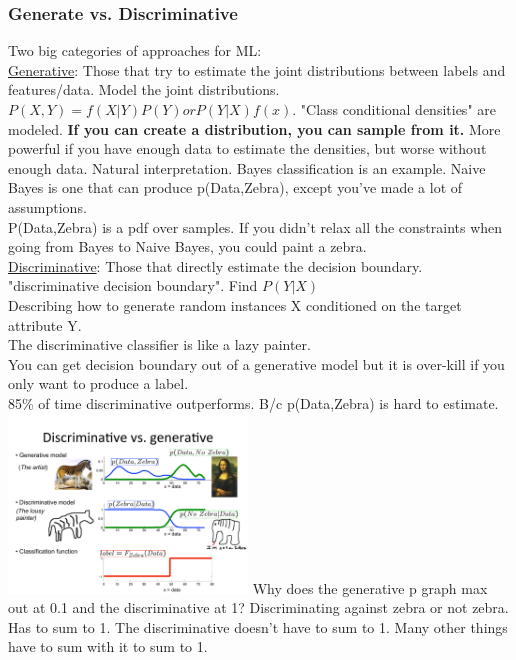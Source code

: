 \subsubsection{Generate vs. Discriminative}
Two big categories of approaches for ML: \hfill \\
\underline{Generative}:
		Those that try to estimate the joint distributions between labels and features/data. 
		Model the joint distributions. $P(X,Y) = f(X|Y) P(Y) or P(Y|X)f(x)$.  
		"Class conditional densities" are modeled.  %
		\textbf{If you can create a distribution, you can sample from it.}  %
		More powerful if you have enough data to estimate the densities, but worse without enough data.
		Natural interpretation.  
		Bayes classification is an example.    
		Naive Bayes is one that can produce p(Data,Zebra), except you've made a lot of assumptions.   \hfill \\  %
		P(Data,Zebra) is a pdf over samples. 
		If you didn't relax all the constraints when going from Bayes to Naive Bayes, you could paint a zebra. 
 \hfill \\
\underline{Discriminative}:
		Those that directly estimate the decision boundary.  "discriminative decision boundary".  Find $P(Y|X)$ \hfill \\
		Describing how to generate random instances X conditioned on the target attribute Y.  \hfill \\
		 The discriminative classifier is like a lazy painter.  \hfill \\  %
		 You can get decision boundary out of a generative model but it is over-kill if you only want to produce a label.  \hfill \\  %
		 85\% of time discriminative outperforms.  B/c p(Data,Zebra) is hard to estimate.  \hfill \\  %
		 
\includegraphics[width=2.5in]{figures/zebra_painting.pdf}
Why does the generative p graph max out at 0.1 and the discriminative at 1?   
    Discriminating against zebra or not zebra.  Has to sum to 1.  
    The discriminative doesn't have to sum to 1.  Many other things have to sum with it to sum to 1. 
		

